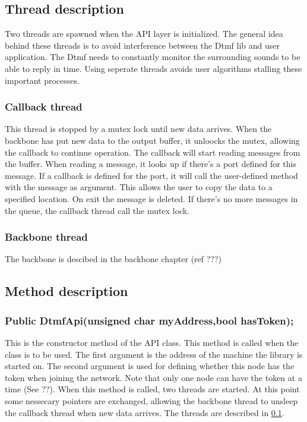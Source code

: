 \subsection{Thread description}
\label{api_thread_description}
Two threads are spawned when the API layer is initialized. The general idea behind these threads is to avoid interference between the Dtmf lib and user application. The Dtmf needs to constantly monitor the surrounding sounds to be able to reply in time. Using seperate threads avoids user algorithms stalling these important processes.

\subsubsection{Callback thread}
This thread is stopped by a mutex lock until new data arrives. When the backbone has put new data to the output buffer, it unloocks the mutex, allowing the callback to continue operation. The callback will start reading messages from the buffer. When reading a message, it looks up if there's a port defined for this message. If a callback is defined for the port, it will call the user-defined method with the message as argument. This allows the user to copy the data to a specified location. On exit the message is deleted. If there's no more messages in the queue, the callback thread call the mutex lock.

\subsubsection{Backbone thread}
The backbone is descibed in the backbone chapter (ref ???)

\subsection{Method description}
\subsubsection*{Public DtmfApi(unsigned char myAddress,bool hasToken);}
This is the constructor method of the API class. This method is called when the class is to be used. The first argument is the address of the machine the library is started on. The second argument is used for defining whether this node has the token when joining the network. Note that only one node can have the token at a time (See ??). When this method is called, two threads are started. At this point some nessecary pointers are exchanged, allowing the backbone thread to unsleep the callback thread when new data arrives. The threads are described in \ref{api_thread_description}.

